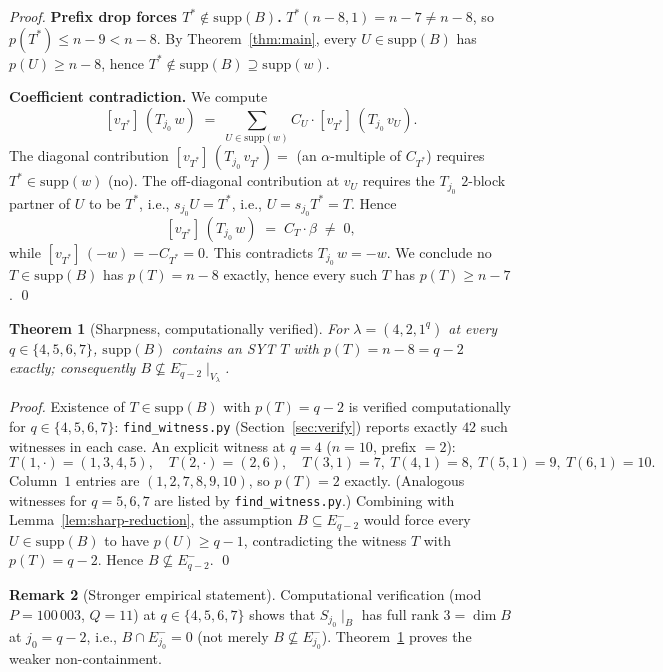 \documentclass[11pt]{article}
\newtheorem{theorem}{Theorem}
\theoremstyle{definition}
\newtheorem{remark}[theorem]{Remark}
\newcommand{\supp}{\mathrm{supp}}
\begin{document}
\begin{proof}
\medskip\textbf{Prefix drop forces $T^* \notin \supp(B)$.}
$T^*(n - 8, 1) = n - 7 \ne n - 8$, so $p(T^*) \le n - 9 < n - 8$.
By Theorem~\ref{thm:main}, every $U \in \supp(B)$ has
$p(U) \ge n - 8$, hence $T^* \notin \supp(B) \supseteq \supp(w)$.

\medskip\textbf{Coefficient contradiction.}  We compute
\[
   [v_{T^*}]\,(T_{j_0}\,w)
   \;=\; \sum_{U \in \supp(w)} C_U \cdot [v_{T^*}]\,(T_{j_0}\,v_U).
\]
The diagonal contribution $[v_{T^*}]\,(T_{j_0}\,v_{T^*}) =$ (an
$\alpha$-multiple of $C_{T^*}$) requires $T^* \in \supp(w)$ (no).
The off-diagonal contribution at $v_U$ requires the $T_{j_0}$
$2$-block partner of $U$ to be $T^*$, i.e., $s_{j_0} U = T^*$,
i.e., $U = s_{j_0} T^* = T$.  Hence
\[
   [v_{T^*}]\,(T_{j_0}\,w) \;=\; C_T \cdot \beta \;\ne\; 0,
\]
while $[v_{T^*}]\,(-w) = -C_{T^*} = 0$.  This contradicts
$T_{j_0}\,w = -w$.  We conclude no $T \in \supp(B)$ has
$p(T) = n - 8$ exactly, hence every such $T$ has $p(T) \ge n - 7$.
\qed
\end{proof}

\begin{theorem}[Sharpness, computationally verified]\label{thm:sharp}
For $\lambda = (4, 2, 1^q)$ at every $q \in \{4, 5, 6, 7\}$,
$\supp(B)$ contains an SYT $T$ with $p(T) = n - 8 = q - 2$ exactly;
consequently $B \not\subseteq E_{q-2}^-\!\mid_{V_\lambda}$.
\end{theorem}

\begin{proof}
Existence of $T \in \supp(B)$ with $p(T) = q - 2$ is verified
computationally for $q \in \{4, 5, 6, 7\}$:
\texttt{find\_witness.py} (Section~\ref{sec:verify}) reports
exactly $42$ such witnesses in each case.  An explicit witness at
$q = 4$ ($n = 10$, prefix $= 2$):
\[
   T(1, \cdot) = (1, 3, 4, 5), \quad T(2, \cdot) = (2, 6), \quad
   T(3, 1) = 7,\ T(4, 1) = 8,\ T(5, 1) = 9,\ T(6, 1) = 10.
\]
Column~$1$ entries are $(1, 2, 7, 8, 9, 10)$, so $p(T) = 2$ exactly.
(Analogous witnesses for $q = 5, 6, 7$ are listed by
\texttt{find\_witness.py}.)  Combining with
Lemma~\ref{lem:sharp-reduction}, the assumption $B \subseteq
E_{q-2}^-$ would force every $U \in \supp(B)$ to have
$p(U) \ge q - 1$, contradicting the witness $T$ with
$p(T) = q - 2$.  Hence $B \not\subseteq E_{q-2}^-$.
\qed
\end{proof}

\begin{remark}[Stronger empirical statement]\label{rem:stronger-sharp}
Computational verification (mod $P = 100\,003$, $Q = 11$) at
$q \in \{4, 5, 6, 7\}$ shows that $S_{j_0}\!\mid_B$ has full rank
$3 = \dim B$ at $j_0 = q - 2$, i.e., $B \cap E_{j_0}^- = 0$ (not
merely $B \not\subseteq E_{j_0}^-$).  Theorem~\ref{thm:sharp} proves
the weaker non-containment.
\end{remark}
\end{document}
